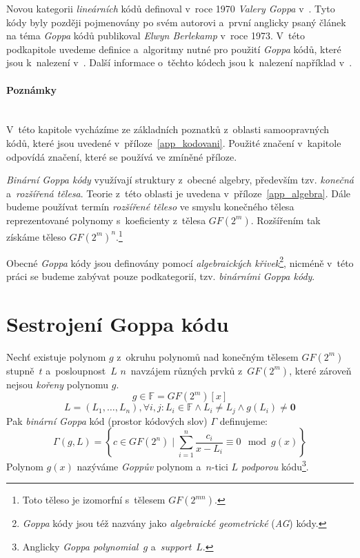 \documentclass[thesis=M,czech,hidelinks]{FITthesis}[2012/06/26]
\newcommand{\0}{{\textcolor[gray]{0.75}{0}}}
\begin{document}
Novou kategorii \emph{lineárních} kódů definoval v~roce 1970 \emph{Valery Goppa}
v~\cite{Goppa}. Tyto kódy byly později pojmenovány po svém autorovi a~první
anglicky psaný článek na téma \emph{Goppa} kódů publikoval \emph{Elwyn
Berlekamp} v~roce 1973. V~této podkapitole uvedeme definice a~algoritmy nutné
pro použití \emph{Goppa} kódů, které jsou k~nalezení
v~\cite{Berlekamp2,Engelbert}. Další informace o~těchto kódech jsou k~nalezení
například v~\cite{McEliece_coding}.

\vfil


\paragraph{Poznámky} \hfil \\
V~této kapitole vycházíme ze základních poznatků z~oblasti
samoopravných kódů, které jsou uvedené v~příloze~\ref{app_kodovani}. Použité
značení v~kapitole odpovídá značení, které se používá ve zmíněné příloze.

\emph{Binární Goppa kódy} využívají struktury z~obecné algebry, především tzv.
\emph{konečná} a~\emph{rozšířená tělesa}. Teorie z~této oblasti je uvedena
v~příloze~\ref{app_algebra}. Dále budeme používat termín \emph{rozšířené
těleso} ve smyslu konečného tělesa reprezentované polynomy s~koeficienty
z~tělesa $GF(2^m)$.  Rozšířením tak získáme těleso $GF(2^m)^n$.\footnote{
    Toto těleso je izomorfní s~tělesem  $GF(2^{mn})$.
}

Obecné \emph{Goppa} kódy jsou definovány pomocí
\emph{algebraických křivek}\footnote{
    \emph{Goppa} kódy jsou též nazvány jako \emph{algebraické geometrické}
    (\emph{AG}) kódy.
}, nicméně v~této práci se budeme zabývat pouze podkategorií, tzv.
\emph{binárními Goppa kódy}.

\vfil



\section{Sestrojení Goppa kódu}

Nechť existuje polynom $g$ z~okruhu polynomů nad konečným tělesem $GF(2^m)$
stupně~$t$ a~posloupnost~$L$ $n$~navzájem různých prvků z~$GF(2^m)$, které
zároveň nejsou \emph{kořeny} polynomu $g$.
$$ g \in \mathbb{F} = GF(2^m)[x] $$
$$
    L = \left( L_1, \ldots, L_n \right),
        \forall i,j : L_i \in \mathbb{F} \land L_i \neq L_j \land g(L_i) \neq \mathbf{0}
$$
Pak \emph{binární Goppa} kód (prostor kódových slov) $\Gamma$ definujeme:
$$
    \Gamma(g,L) =
        \left\{
            c \in GF(2^n)
            \;|\;
            \sum_{i=1}^{n} \frac{c_i}{x - L_i} \equiv 0 \mod g(x)
        \right\}
$$
Polynom $g(x)$ nazýváme \emph{Goppův}
polynom a~$n$-tici $L$ \emph{podporou} kódu\footnote{
    Anglicky \emph{Goppa polynomial}~$g$ a~\emph{support}~$L$.
}.
\end{document}
